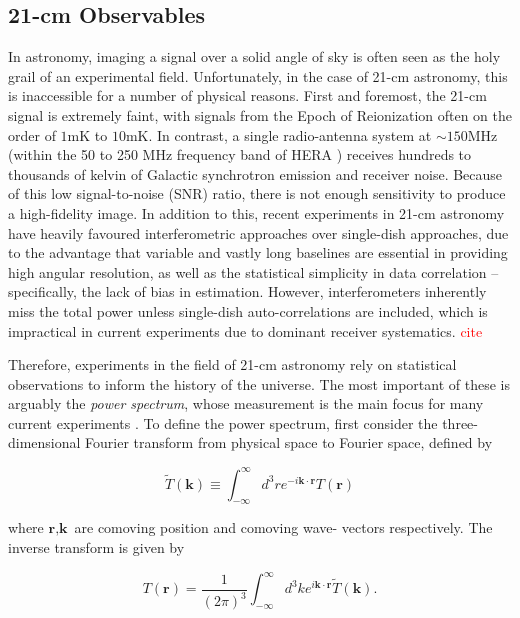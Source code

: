 \documentclass[floats,floatfix,showpacs,amssymb,prd,superscriptaddress,nofootinbib]{revtex4-2} %
\newcommand{\red}{\textcolor{red}}
\begin{document}
\subsection{21-cm Observables}

In astronomy, imaging a signal over a solid angle of sky is often seen as the holy grail of an experimental field. Unfortunately, in the case of 21-cm astronomy, this is inaccessible for a number of physical reasons. First and foremost, the 21-cm signal is extremely faint, with signals from the Epoch of Reionization often on the order of $1 \text{mK}$ to $10 \text{mK}$.
In contrast, a single radio-antenna system at  $\sim 150 \text{MHz}$ (within the 50 to 250 MHz frequency band of HERA \citep{DeBoer_2017}) receives hundreds to thousands of kelvin of Galactic synchrotron emission and receiver noise. Because of this low signal-to-noise (SNR) ratio, there is not enough sensitivity to produce a high-fidelity image. In addition to this, recent experiments in 21-cm astronomy have heavily favoured interferometric approaches over single-dish approaches, due to the advantage that variable and vastly long baselines are essential in providing high angular resolution, as well as the statistical simplicity in data correlation -- specifically, the lack of bias in estimation. However, interferometers inherently miss the total power unless single-dish auto-correlations are included, which is impractical in current experiments due to dominant receiver systematics. \red{cite}

Therefore, experiments in the field of 21-cm astronomy rely on statistical observations to inform the history of the universe. The most important of these is arguably the \textit{power spectrum}, whose measurement is the main focus for many current experiments \citep{DeBoer_2017}. To define the power spectrum, first consider the three-dimensional Fourier transform from physical space to Fourier space, defined by

\begin{equation}
    \tilde{T} (\textbf{k}) \equiv \int^\infty _{-\infty} d^3 r e^{-i\textbf{k} \cdot \textbf{r}} T(\textbf{r})
\end{equation}

\noindent where $\textbf{r}, \textbf{k}$ are comoving position and comoving wave- vectors respectively. The inverse transform is given by 

\begin{equation}
    T(\textbf{r}) = \frac{1}{(2 \pi)^3} \int^\infty _{-\infty} d^3 k e^{i \textbf{k} \cdot \textbf{r}} \tilde{T}(\textbf{k}).
\end{equation}
\end{document}
